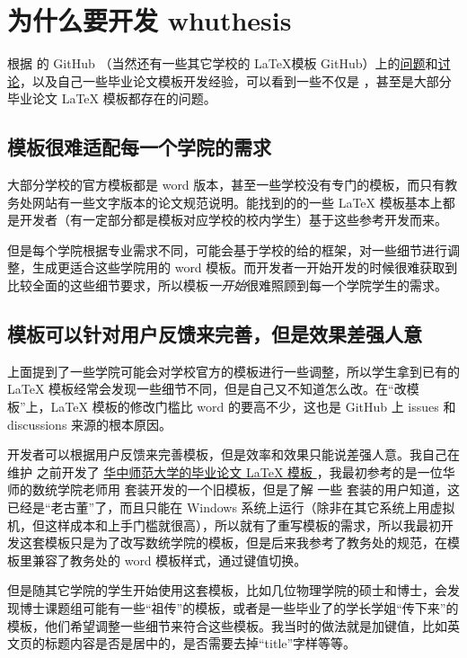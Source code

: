 \section{为什么要开发 whuthesis}

根据  的 GitHub （当然还有一些其它学校的 \LaTeX 模板 GitHub）上的\href{https://github.com/whutug/whu-thesis/issues}{问题}和\href{https://github.com/whutug/whu-thesis/discussions}{讨论}，以及自己一些毕业论文模板开发经验，可以看到一些不仅是 ，甚至是大部分毕业论文 \LaTeX{} 模板都存在的问题。


\subsection{模板很难适配每一个学院的需求}

大部分学校的官方模板都是 word 版本，甚至一些学校没有专门的模板，而只有教务处网站有一些文字版本的论文规范说明。能找到的的一些 \LaTeX{} 模板基本上都是开发者（有一定部分都是模板对应学校的校内学生）基于这些参考开发而来。
  
但是每个学院根据专业需求不同，可能会基于学校的给的框架，对一些细节进行调整，生成更适合这些学院用的 word 模板。而开发者一开始开发的时候很难获取到比较全面的这些细节要求，所以模板\emph{一开始}很难照顾到每一个学院学生的需求。


\subsection{模板可以针对用户反馈来完善，但是效果差强人意}

上面提到了一些学院可能会对学校官方的模板进行一些调整，所以学生拿到已有的 \LaTeX{} 模板经常会发现一些细节不同，但是自己又不知道怎么改。在“改模板”上，\LaTeX{} 模板的修改门槛比 word 的要高不少，这也是 GitHub 上 issues 和 discussions 来源的根本原因。

开发者可以根据用户反馈来完善模板，但是效率和效果只能说差强人意。我自己在维护  之前开发了 \href{https://github.com/xkwxdyy/CCNUthesis}{华中师范大学的毕业论文 \LaTeX{} 模板 }，我最初参考的是一位华师的数统学院老师用 \CTeX 套装开发的一个旧模板，但是了解 一些 \CTeX 套装的用户知道，这已经是“老古董”了，而且只能在 Windows 系统上运行（除非在其它系统上用虚拟机，但这样成本和上手门槛就很高），所以就有了重写模板的需求，所以我最初开发这套模板只是为了改写数统学院的模板，但是后来我参考了教务处的规范，在模板里兼容了教务处的 word 模板样式，通过键值切换。

但是随其它学院的学生开始使用这套模板，比如几位物理学院的硕士和博士，会发现博士课题组可能有一些“祖传”的模板，或者是一些毕业了的学长学姐“传下来”的模板，他们希望调整一些细节来符合这些模板。我当时的做法就是加键值，比如英文页的标题内容是否是居中的，是否需要去掉“title”字样等等。

